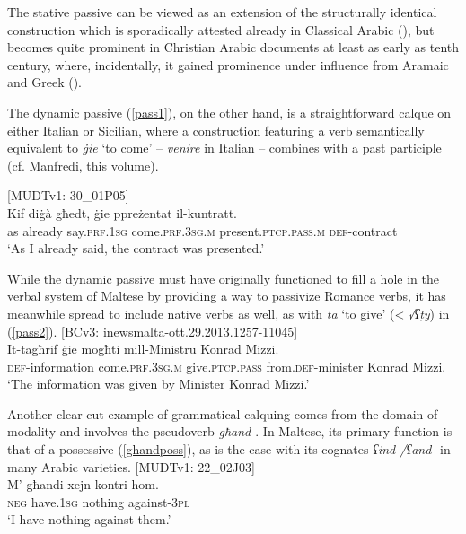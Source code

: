 \documentclass[output=paper]{langsci/langscibook}
\begin{document}
The stative passive can be viewed as an extension of the structurally identical construction which is sporadically attested already in Classical Arabic (\citealt[76--84]{Ullmann1989}), but becomes quite prominent in Christian Arabic documents at least as early as tenth century, where, incidentally, it gained prominence under influence from Aramaic and Greek (\citealt[424]{Blau1967}).

The dynamic passive (\ref{pass1}), on the other hand, is a straightforward calque on either Italian or Sicilian, where a construction featuring a verb semantically equivalent to \textit{ġie} `to come' -- \textit{venire} in Italian -- combines with a past participle (cf. Manfredi, this volume).

\ea\label{pass1} 
{[MUDTv1: 30\_01P05]} \\
\gll Kif diġà għedt, ġie ppreżentat il-kuntratt.\\
	as already say.\textsc{prf.1sg} come.\textsc{prf.3sg.m} present.\textsc{ptcp.pass.m} \textsc{def}-contract\\
	\glt `As I already said, the contract was presented.'\\
\z

While the dynamic passive must have originally functioned to fill a hole in the verbal system of Maltese by providing a way to passivize Romance verbs, it has meanwhile spread to include native verbs as well, as with \textit{ta} `to give' (< \textit{√ʕṭy}) in (\ref{pass2}).
\ea\label{pass2} 
{[BCv3: inewsmalta-ott.29.2013.1257-11045]} \\
\gll It-tagħrif ġie mogħti mill-Ministru Konrad Mizzi.\\
	\textsc{def}-information come.\textsc{prf.3sg.m} give.\textsc{ptcp.pass} from.\textsc{def}-minister Konrad Mizzi.\\
	\glt `The information was given by Minister Konrad Mizzi.'\\
\z

Another clear-cut example of grammatical calquing comes from the domain of modality and involves the pseudoverb \textit{għand-}. In Maltese, its primary function is that of a possessive (\ref{ghandposs}), as is the case with its cognates \textit{ʕind-/ʕand-} in many Arabic varieties.
\ea\label{ghandposs}  
{[MUDTv1: 22\_02J03]} \\
    \gll M' għandi xejn kontri-hom.\\
	\textsc{neg} have.\textsc{1sg} nothing against-\textsc{3pl}\\
	\glt `I have nothing against them.'\\
\z
\end{document}
